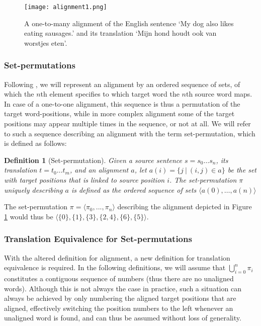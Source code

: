 \documentclass{report}
\theoremstyle{break}
\newtheorem{definition}{Definition}
\begin{document}
\begin{figure}
\centering
\texttt{[image: alignment1.png]}
\caption{A one-to-many alignment of the English sentence `My dog also likes eating sausages.' and its translation `Mijn hond houdt ook van worstjes eten'.%
\cite{maillette2010visualizing}
}\label{fig:alignment2}
\end{figure}

\subsubsection{Set-permutations}

Following \cite{simaan2013hats}, we will represent an alignment by an ordered sequence of sets, of which the $n$th element specifies to which target word the $n$th source word maps. In case of a one-to-one alignment, this sequence is thus a permutation of the target word-positions, while in more complex alignment some of the target positions may appear multiple times in the sequence, or not at all. We will refer to such a sequence describing an alignment with the term set-permutation, which is defined as follows:

\begin{definition}[Set-permutation]\label{def:sperm}
Given a source sentence $s = s_0 \ldots s_n$, its translation $t = t_0 \ldots t_m$, and an alignment $a$, let $a(i) = \{j~|~(i,j)\in a\}$ be the set with target positions that is linked to source position $i$. The set-permutation $\pi$ uniquely describing $a$ is defined as the ordered sequence of sets
$\langle a(0), \ldots, a(n) \rangle$
\end{definition}

\noindent The set-permutation $\pi = \langle\pi_0, ..., \pi_n\rangle$ describing the alignment depicted in Figure \ref{fig:alignment2} would thus be $\langle \{0\}, \{1\}, \{3\}, \{2,4\}, \{6\}, \{5\}\rangle$. 

\subsubsection{Translation Equivalence for Set-permutations}

With the altered definition for alignment, a new definition for translation equivalence is required. In the following definitions, we will assume that $\bigcup_{i=0}^{n} \pi_i$ constitutes a contiguous sequence of numbers (thus there are no unaligned words). Although this is not always the case in practice, such a situation can always be achieved by only numbering the aligned target positions that are aligned, effectively switching the position numbers to the left whenever an unaligned word is found, and can thus be assumed without loss of generality.
\end{document}
